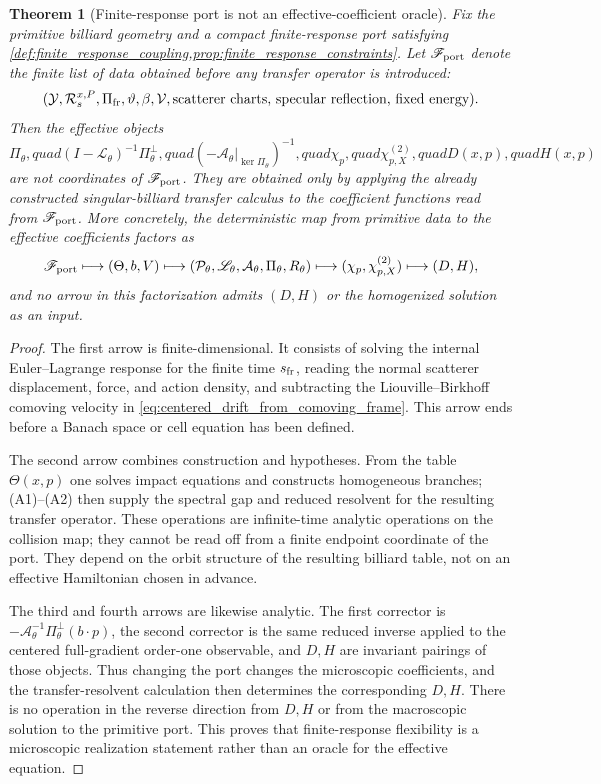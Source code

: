 \documentclass[12pt, letterpaper]{amsart}
\newcommand{\Acal}{\mathcal{A}}
\newcommand{\Pcal}{\mathcal{P}}
\providecommand{\Ltransfer}{\mathscr{L}}
\providecommand{\Piperp}{\Pi^\perp}
\newcommand{\Pifr}{\Pi_{\mathrm{fr}}}
\theoremstyle{plain}
\newtheorem{theorem}{Theorem}[section]
\theoremstyle{definition}
\theoremstyle{remark}
\begin{document}
\begin{theorem}[Finite-response port is not an effective-coefficient oracle]
\label{thm:port_not_effective_oracle}
Fix the primitive billiard geometry and a compact finite-response port satisfying
\cref{def:finite_response_coupling,prop:finite_response_constraints}.  Let
\(\mathscr F_{\rm port}\) denote the finite list of data obtained before any
transfer operator is introduced:
\[
   (\mathcal Y,\mathcal R_s^{x,P},\Pifr,\vartheta,\beta,\mathcal V,
   \hbox{scatterer charts, specular reflection, fixed energy}).
\]
Then the effective objects
\[
   \Pi_\theta,quad
   (I-\Ltransfer_\theta)^{-1}\Piperp_\theta,quad
   (-\Acal_\theta|_{\ker\Pi_\theta})^{-1},quad
   \chi_p,quad \chi^{(2)}_{p,X},quad D(x,p),quad H(x,p)
\]
are not coordinates of \(\mathscr F_{\rm port}\).  They are obtained only by
applying the already constructed singular-billiard transfer calculus to the
coefficient functions read from \(\mathscr F_{\rm port}\).  More concretely,
the deterministic map from primitive data to the effective coefficients factors
as
\[
\mathscr F_{\rm port}
\longmapsto
(\Theta,b,V)
\longmapsto
(\Pcal_\theta,\Ltransfer_\theta,\Acal_\theta,\Pi_\theta,R_\theta)
\longmapsto
(\chi_p,\chi^{(2)}_{p,X})
\longmapsto
(D,H),
\]
and no arrow in this factorization admits \((D,H)\) or the homogenized solution
as an input.
\end{theorem}

\begin{proof}
The first arrow is finite-dimensional.  It consists of solving the internal
Euler--Lagrange response for the finite time \(s_{\rm fr}\), reading the normal
scatterer displacement, force, and action density, and subtracting the
Liouville--Birkhoff comoving velocity in \eqref{eq:centered_drift_from_comoving_frame}.
This arrow ends before a Banach space or cell equation has been defined.

The second arrow combines construction and hypotheses.  From the table
\(\Theta(x,p)\) one solves impact equations and constructs homogeneous branches;
\textup{(A1)--(A2)} then supply the spectral gap and reduced resolvent for the
resulting transfer operator.
These operations are infinite-time analytic operations on the collision map; they
cannot be read off from a finite endpoint coordinate of the port.  They depend on
the orbit structure of the resulting billiard table, not on an effective
Hamiltonian chosen in advance.

The third and fourth arrows are likewise analytic.  The first corrector is
\(-\Acal_\theta^{-1}\Piperp_\theta(b\cdot p)\), the second corrector is the
same reduced inverse applied to the centered full-gradient order-one observable,
and \(D,H\) are invariant pairings of those objects.  Thus changing the port
changes the microscopic coefficients, and the transfer-resolvent calculation then
determines the corresponding \(D,H\).  There is no operation in the reverse
direction from \(D,H\) or from the macroscopic solution to the primitive port.
This proves that finite-response flexibility is a microscopic realization
statement rather than an oracle for the effective equation.
\end{proof}
\end{document}
